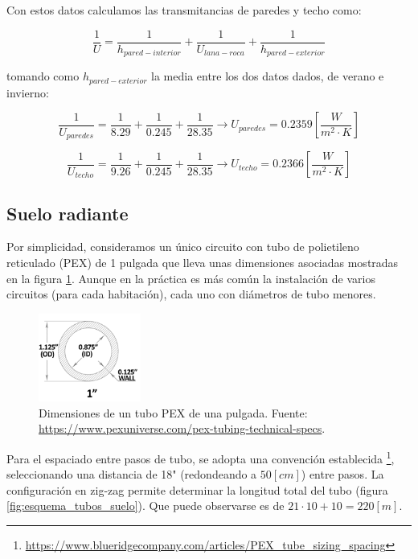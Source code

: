 Con estos datos calculamos las transmitancias de paredes y techo como:

\begin{equation}
	\frac{1}{U} = \frac{1}{h_{pared-interior}} + \frac{1}{U_{lana-roca}} + \frac{1}{h_{pared-exterior}}
\end{equation}

tomando como $h_{pared-exterior}$ la media entre los dos datos dados, de verano
e invierno:

\begin{equation}
	\frac{1}{U_{paredes}} = \frac{1}{8.29} + \frac{1}{0.245} + \frac{1}{28.35} \rightarrow U_{paredes} = 0.2359 \left[\frac{W}{m^2 \cdot K}\right]
\end{equation}

\begin{equation}
	\frac{1}{U_{techo}} = \frac{1}{9.26} + \frac{1}{0.245} + \frac{1}{28.35} \rightarrow U_{techo} = 0.2366 \left[\frac{W}{m^2 \cdot K}\right]
\end{equation}


\subsection{Suelo radiante}

Por simplicidad, consideramos un único circuito con tubo de polietileno reticulado (PEX) de 1
pulgada que lleva unas dimensiones asociadas mostradas en la figura
\ref{fig:1_inch_pex}.
Aunque en la práctica es más común la instalación de varios circuitos (para
cada habitación), cada uno con diámetros de tubo menores.

\begin{figure}[h] \centering
	\centering
	\includegraphics[width=0.3\textwidth]{./capitulos/resultados_discusion/images/1_inch_pex.png}
	\caption{Dimensiones de un tubo PEX de una pulgada. Fuente: \url{https://www.pexuniverse.com/pex-tubing-technical-specs}.}
	\label{fig:1_inch_pex}
\end{figure}


Para el espaciado entre pasos de tubo, se adopta una convención establecida
\footnote{\url{https://www.blueridgecompany.com/articles/PEX_tube_sizing_spacing}},
seleccionando una distancia de 18" (redondeando a $50[cm]$) entre pasos. La
configuración en zig-zag permite determinar la longitud total del tubo (figura
\ref{fig:esquema_tubos_suelo}). Que puede observarse es de $21 \cdot 10 + 10 =
220[m]$.

